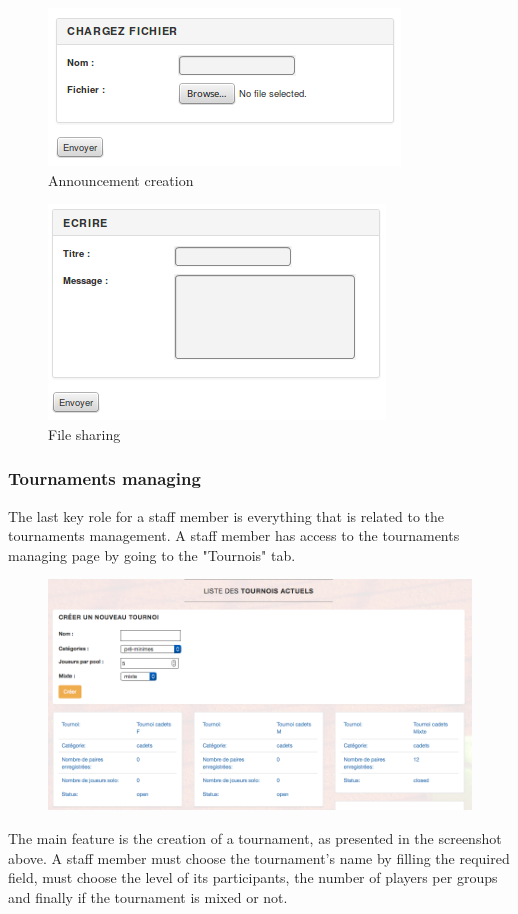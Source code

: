 \documentclass[a4paper, 12pt]{article}
\begin{document}
\begin{figure}[h]
  \caption{\label{annonce} Announcement creation}
  \includegraphics[scale=0.7]{annonce.png}
\end{figure}
\FloatBarrier
\begin{figure}[h]
  \caption{\label{file} File sharing}
  \includegraphics[scale=0.7]{fichier.png}
\end{figure}
\FloatBarrier

 \newpage


\subsubsection*{Tournaments managing}
The last key role for a staff member is everything that is related to the tournaments management. A staff member has access to the tournaments managing page by going to the "Tournois" tab.\\

\begin{figure}[h]
\includegraphics[scale=0.5]{stafftournament.png}
\end{figure}
\FloatBarrier
The main feature is the creation of a tournament, as presented in the screenshot above. A staff member must choose the tournament's name by filling the required field, must choose the level of its participants, the number of players per groups and finally if the tournament is mixed or not.\\
\end{document}
